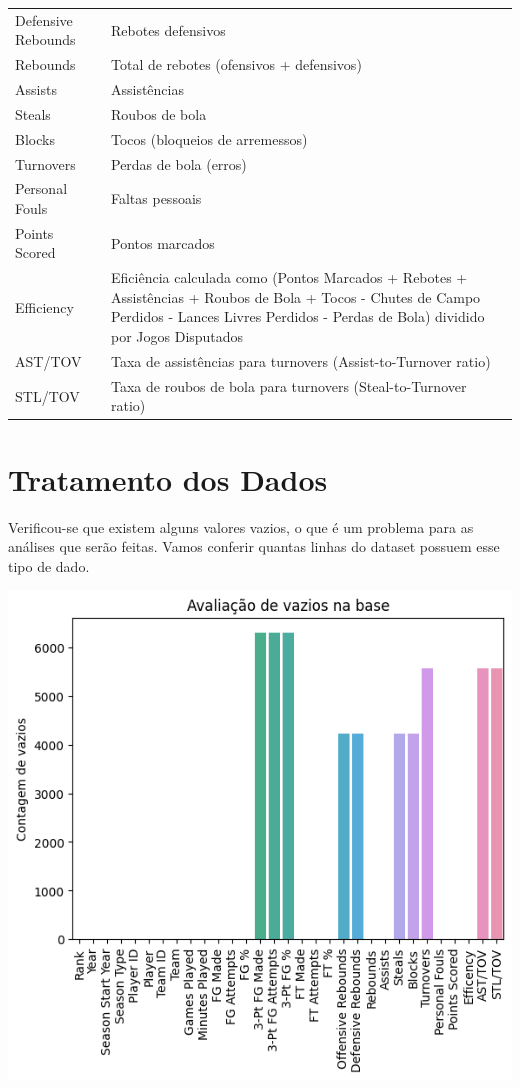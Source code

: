 \documentclass[
]{book}
\begin{document}
\begin{longtable}[]{@{}
  >{\raggedright\arraybackslash}p{}
  >{\raggedright\arraybackslash}p{}@{}}
Defensive Rebounds & Rebotes defensivos \\
Rebounds & Total de rebotes (ofensivos + defensivos) \\
Assists & Assistências \\
Steals & Roubos de bola \\
Blocks & Tocos (bloqueios de arremessos) \\
Turnovers & Perdas de bola (erros) \\
Personal Fouls & Faltas pessoais \\
Points Scored & Pontos marcados \\
Efficiency & Eficiência calculada como (Pontos Marcados + Rebotes + Assistências + Roubos de Bola + Tocos - Chutes de Campo Perdidos - Lances Livres Perdidos - Perdas de Bola) dividido por Jogos Disputados \\
AST/TOV & Taxa de assistências para turnovers (Assist-to-Turnover ratio) \\
STL/TOV & Taxa de roubos de bola para turnovers (Steal-to-Turnover ratio) \\
\bottomrule()
\end{longtable}

\hypertarget{tratamento-dos-dados}{%
\chapter{Tratamento dos Dados}\label{tratamento-dos-dados}}

Verificou-se que existem alguns valores vazios, o que é um problema para as análises que serão feitas. Vamos conferir quantas linhas do dataset possuem esse tipo de dado.

\includegraphics{imagens/1.png}
\end{document}
